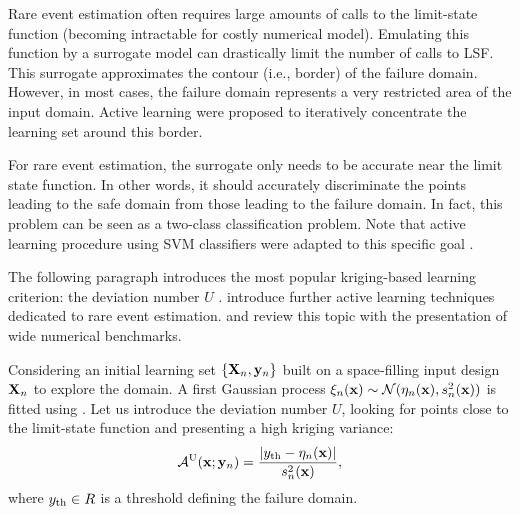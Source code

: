 Rare event estimation often requires large amounts of calls to the limit-state function (becoming intractable for costly numerical model). 
Emulating this function by a surrogate model can drastically limit the number of calls to LSF. 
This surrogate approximates the contour (i.e., border) of the failure domain. 
However, in most cases, the failure domain represents a very restricted area of the input domain. 
Active learning were proposed to iteratively concentrate the learning set around this border. 

For rare event estimation, the surrogate only needs to be accurate near the limit state function. 
In other words, it should accurately discriminate the points leading to the safe domain from those leading to the failure domain.
In fact, this problem can be seen as a two-class classification problem. 
Note that active learning procedure using SVM classifiers were adapted to this specific goal \citep{bourinet_2018}. 

The following paragraph introduces the most popular kriging-based learning criterion: the deviation number $U$ \citep{echard_2011}. 
\citet{MorioBalesdent2015} introduce further active learning techniques dedicated to rare event estimation. 
\citet{teixeira_2021} and \citet{moustapha_ss_2022} review this topic with the presentation of wide numerical benchmarks.

Considering an initial learning set $\left\{{\bf X}_n, {\bf y}_n\right\}$ built on a space-filling input design ${\bf X}_n$ to explore the domain. 
A first Gaussian process $\xi_n({\bf x}) \sim \mathcal{N}(\eta_n({\bf x}), s_n^2({\bf x}))$ is fitted using . 
Let us introduce the deviation number $U$, looking for points close to the limit-state function and presenting a high kriging variance: 
\begin{equation}
    \mathcal{A}^{\textrm{U}}({\bf x}; {\bf y}_n) = \frac{\left|y_\mathrm{th} - \eta_n({\bf x})\right|}{s_n^2({\bf x})}, 
    \label{eq:U}
\end{equation}
where $y_\mathrm{th} \in R$ is a threshold defining the failure domain.

